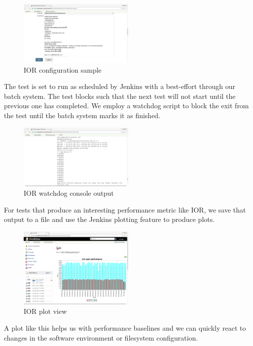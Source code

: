 \documentclass[10pt, conference, compsocconf]{IEEEtran}
\begin{document}
{\begin{figure}[H]
\centering
\includegraphics[width=0.5\textwidth]{IOR-configuration-sample}
\caption{ IOR configuration sample }
\label{fig:IOR-configuration-sample}
\end{figure}

The test is set to run as scheduled by Jenkins with a best-effort through our batch system.  The test blocks such that the next test will not start until the previous one has completed.  We employ a watchdog script to block the exit from the test until the batch system marks it as finished.

\begin{figure}[H]
\centering
\includegraphics[width=0.5\textwidth]{IOR-watchdog-out}
\caption{ IOR watchdog console output }
\label{fig:IOR-watchdog-out}
\end{figure}
For tests that produce an interesting performance metric like IOR, we save that output to a file and use the Jenkins plotting feature to produce plots. 
\begin{figure}[H]
\centering
\includegraphics[width=0.5\textwidth]{IOR-plot}
\caption{ IOR plot view }
\label{fig:IOR-plot}
\end{figure}
A plot like this helps us with performance baselines and we can quickly react to changes in the software environment or filesystem configuration.

}
\end{document}
